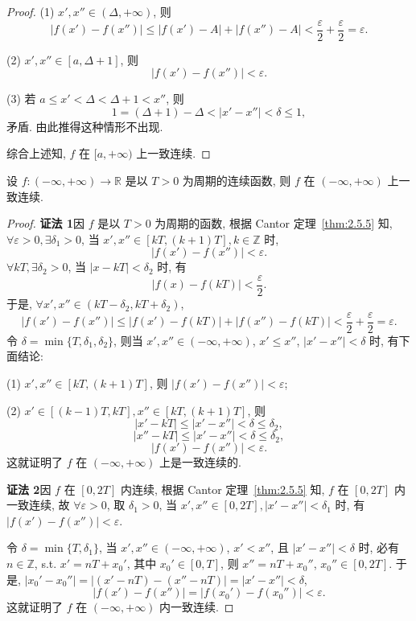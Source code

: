\begin{proof}
(1) $x', x'' \in (\Delta, +\infty)$, 则
\[
|f(x') - f(x'')| \leqslant |f(x') - A| + |f(x'') - A| < \frac{\varepsilon}{2} + \frac{\varepsilon}{2} = \varepsilon.
\]

(2) $x', x'' \in [a, \Delta+1]$, 则
\[
|f(x') - f(x'')| < \varepsilon.
\]

(3) 若 $a \leqslant x' < \Delta < \Delta + 1 < x''$, 则
\[
1 = (\Delta + 1) - \Delta < |x' - x''| < \delta \leqslant 1,
\]
矛盾. 由此推得这种情形不出现.

综合上述知, $f$ 在 $[a,+\infty)$ 上一致连续.
\end{proof}

\begin{example}\label{ex:2.5.11}
设 $f\colon (-\infty, +\infty) \to \mathbb{R}$ 是以 $T > 0$ 为周期的连续函数, 则 $f$ 在 $(-\infty, +\infty)$ 上一致连续.
\end{example}

\begin{proof}
\textbf{证法 1}\quad 因 $f$ 是以 $T > 0$ 为周期的函数, 根据 Cantor 定理~\ref{thm:2.5.5} 知, $\forall \varepsilon > 0, \exists \delta_1 > 0$, 当 $x', x'' \in [kT, (k+1)T], k \in \mathbb{Z}$ 时,
\[
|f(x') - f(x'')| < \varepsilon.
\]
$\forall kT, \exists \delta_2 > 0$, 当 $|x - kT| < \delta_2$ 时, 有
\[
|f(x) - f(kT)| < \frac{\varepsilon}{2}.
\]
于是, $\forall x', x'' \in (kT - \delta_2, kT + \delta_2)$,
\[
|f(x') - f(x'')| \leqslant |f(x') - f(kT)| + |f(x'') - f(kT)| < \frac{\varepsilon}{2} + \frac{\varepsilon}{2} = \varepsilon.
\]
令 $\delta = \min\{T, \delta_1, \delta_2\}$, 则当 $x', x'' \in (-\infty, +\infty)$, $x' \leqslant x''$, $|x' - x''| < \delta$ 时, 有下面结论:

(1) $x', x'' \in [kT, (k+1)T]$, 则 $|f(x') - f(x'')| < \varepsilon$;

(2) $x' \in [(k-1)T, kT], x'' \in [kT, (k+1)T]$, 则
\[
|x' - kT| \leqslant |x' - x''| < \delta \leqslant \delta_2,
\]
\[
|x'' - kT| \leqslant |x' - x''| < \delta \leqslant \delta_2,
\]
\[
|f(x') - f(x'')| < \varepsilon.
\]
这就证明了 $f$ 在 $(-\infty, +\infty)$ 上是一致连续的.

\textbf{证法 2}\quad 因 $f$ 在 $[0,2T]$ 内连续, 根据 Cantor 定理~\ref{thm:2.5.5} 知, $f$ 在 $[0,2T]$ 内一致连续, 故 $\forall \varepsilon > 0$, 取 $\delta_1 > 0$, 当 $x', x'' \in [0,2T], |x' - x''| < \delta_1$ 时, 有 $|f(x') - f(x'')| < \varepsilon$.

令 $\delta = \min\{T, \delta_1\}$, 当 $x', x'' \in (-\infty, +\infty)$, $x' < x''$, 且 $|x' - x''| < \delta$ 时, 必有 $n \in \mathbb{Z}$, s.t. $x' = nT + x_0'$, 其中 $x_0' \in [0, T]$, 则 $x'' = nT + x_0''$, $x_0'' \in [0, 2T]$. 于是, $|x_0' - x_0''| = |(x' - nT) - (x'' - nT)| = |x' - x''| < \delta$,
\[
|f(x') - f(x'')| = |f(x_0') - f(x_0'')| < \varepsilon.
\]
这就证明了 $f$ 在 $(-\infty, +\infty)$ 内一致连续.
\end{proof}


